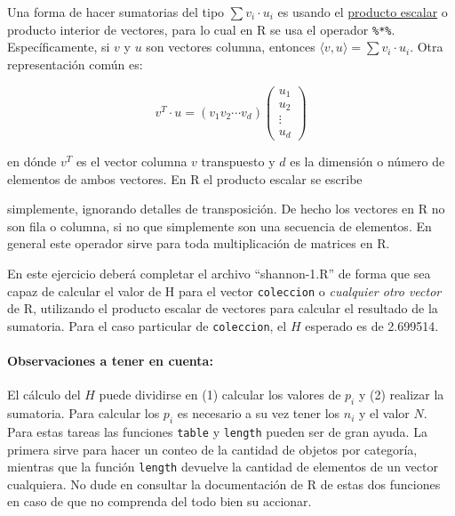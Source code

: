 \documentclass[]{article}
\newenvironment{Shaded}{}{}
\newcommand{\NormalTok}[1]{{#1}}
\begin{document}
Una forma de hacer sumatorias del tipo $\sum v_i \cdot u_i$ es usando el
\href{https://es.wikipedia.org/wiki/Producto\_escalar}{producto escalar}
o producto interior de vectores, para lo cual en R se usa el operador
\texttt{\%*\%}. Específicamente, si $v$ y $u$ son vectores columna,
entonces $\langle v, u \rangle = \sum v_i \cdot u_i$. Otra
representación común es:

\[
  v^T \cdot u = (v_1 v_2 \cdots v_d)
    \begin{pmatrix}
      u_1 \\
      u_2 \\
      \vdots \\
      u_d
    \end{pmatrix}
\]

en dónde $v^T$ es el vector columna $v$ transpuesto y $d$ es la
dimensión o número de elementos de ambos vectores. En R el producto
escalar se escribe

\begin{Shaded}
\end{Shaded}
simplemente, ignorando detalles de transposición. De hecho los vectores
en R no son fila o columna, si no que simplemente son una secuencia de
elementos. En general este operador sirve para toda multiplicación de
matrices en R.

En este ejercicio deberá completar el archivo ``shannon-1.R'' de forma
que sea capaz de calcular el valor de H para el vector
\texttt{coleccion} o \emph{cualquier otro vector} de R, utilizando el
producto escalar de vectores para calcular el resultado de la sumatoria.
Para el caso particular de \texttt{coleccion}, el $H$ esperado es de
2.699514.

\paragraph{Observaciones a tener en cuenta:}

El cálculo del $H$ puede dividirse en (1) calcular los valores de $p_i$
y (2) realizar la sumatoria. Para calcular los $p_i$ es necesario a su
vez tener los $n_i$ y el valor $N$. Para estas tareas las funciones
\texttt{table} y \texttt{length} pueden ser de gran ayuda. La primera
sirve para hacer un conteo de la cantidad de objetos por categoría,
mientras que la función \texttt{length} devuelve la cantidad de
elementos de un vector cualquiera. No dude en consultar la documentación
de R de estas dos funciones en caso de que no comprenda del todo bien su
accionar.
\end{document}

